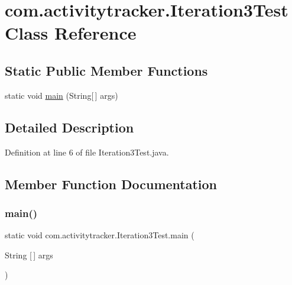 \hypertarget{classcom_1_1activitytracker_1_1_iteration3_test}{}\section{com.\+activitytracker.\+Iteration3\+Test Class Reference}
\label{classcom_1_1activitytracker_1_1_iteration3_test}
\subsection*{Static Public Member Functions}
\begin{DoxyCompactItemize}
\item 
static void \mbox{\hyperlink{classcom_1_1activitytracker_1_1_iteration3_test_a54f41d79b383667b8f79258dbfd7771c}{main}} (String\mbox{[}$\,$\mbox{]} args)
\end{DoxyCompactItemize}


\subsection{Detailed Description}


Definition at line 6 of file Iteration3\+Test.\+java.



\subsection{Member Function Documentation}
\mbox{\label{classcom_1_1activitytracker_1_1_iteration3_test_a54f41d79b383667b8f79258dbfd7771c}} 
\subsubsection{\texorpdfstring{main()}{main()}}
{\footnotesize\ttfamily static void com.\+activitytracker.\+Iteration3\+Test.\+main (\begin{DoxyParamCaption}\item[{String \mbox{[}$\,$\mbox{]}}]{args }\end{DoxyParamCaption})\hspace{0.3cm}{\ttfamily [static]}}



